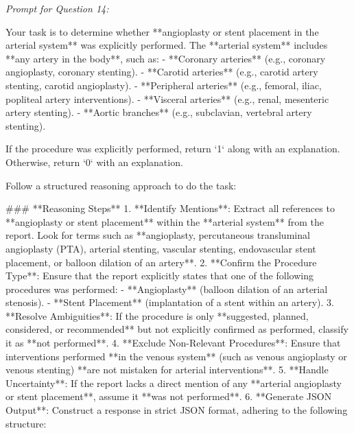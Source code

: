 \textit{\normalsize Prompt for Question  14:}
\begin{mdframed}[]
\normalsize

Your task is to determine whether **angioplasty or stent placement in the arterial system** was explicitly performed. The **arterial system** includes **any artery in the body**, such as:  
- **Coronary arteries** (e.g., coronary angioplasty, coronary stenting).  
- **Carotid arteries** (e.g., carotid artery stenting, carotid angioplasty).  
- **Peripheral arteries** (e.g., femoral, iliac, popliteal artery interventions).  
- **Visceral arteries** (e.g., renal, mesenteric artery stenting).  
- **Aortic branches** (e.g., subclavian, vertebral artery stenting).  

If the procedure was explicitly performed, return `1` along with an explanation. Otherwise, return `0` with an explanation.

Follow a structured reasoning approach to do the task:

### **Reasoning Steps**  
1. **Identify Mentions**: Extract all references to **angioplasty or stent placement** within the **arterial system** from the report. Look for terms such as **angioplasty, percutaneous transluminal angioplasty (PTA), arterial stenting, vascular stenting, endovascular stent placement, or balloon dilation of an artery**.  
2. **Confirm the Procedure Type**: Ensure that the report explicitly states that one of the following procedures was performed:  
   - **Angioplasty** (balloon dilation of an arterial stenosis).  
   - **Stent Placement** (implantation of a stent within an artery).  
3. **Resolve Ambiguities**: If the procedure is only **suggested, planned, considered, or recommended** but not explicitly confirmed as performed, classify it as **not performed**.  
4. **Exclude Non-Relevant Procedures**: Ensure that interventions performed **in the venous system** (such as venous angioplasty or venous stenting) **are not mistaken for arterial interventions**.  
5. **Handle Uncertainty**: If the report lacks a direct mention of any **arterial angioplasty or stent placement**, assume it **was not performed**.  
6. **Generate JSON Output**: Construct a response in strict JSON format, adhering to the following structure:  

\end{mdframed}

